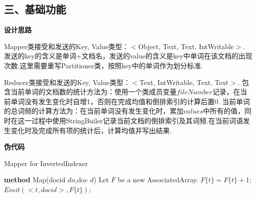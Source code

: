 \documentclass[a4paper,UTF8]{article}
\theoremstyle{definition}
\begin{document}
\begin{CJK}{UTF8}{gkai}
\begin{CJK*}{UTF8}{gbsn}
\section*{三、基础功能}
\end{CJK*}
	\par \textbf{设计思路}
	\par Mapper类接受和发送的Key, Value类型：$<$Object, Text, Text, IntWritable$>$. 发送的key的含义是单词+文档名，发送的value的含义是key中单词在该文档的出现次数.这里需要重写Partitioner类，按照key中的单词作为划分标准.
	\par Reducer类接受和发送的Key, Value类型：$<$Text, IntWritable, Text, Text$>$. 包含当前单词的文档数的统计方法为：使用一个类成员变量$fileNumber$记录，在当前单词没有发生变化时自增1，否则在完成均值和倒排索引的计算后置0. 当前单词的总词频的计算方法为：在当前单词没有发生变化时，累加$values$中所有的值，同时在这一过程中使用StringBuiler记录当前文档的倒排索引及其词频.在当前词语发生变化时及完成所有项的统计后，计算均值并写出结果.
	\par \textbf{伪代码}

\begin{algorithm}[H]
\caption{Mapper for InvertedIndexer}
\label{alg:Framwork}
\begin{algorithmic}[1] %
	 \STATE \textbf{method} Map(docid $dn$,doc $d$)
    \STATE Let $F$ be a new AssociatedArray.
	 	\STATE $F\{t\} = F\{t\} + 1$;
	 \ENDFOR
	 	\STATE $Emit(<t, docid>, F\{t\})$;
	 \ENDFOR
	 \RETURN
\end{algorithmic}
\end{algorithm}


\end{CJK}
\end{document}
